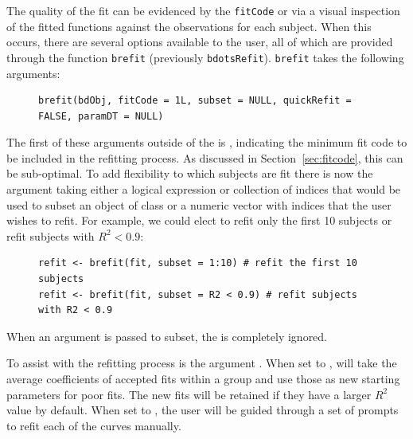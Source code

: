 The quality of the fit can be evidenced by the \texttt{fitCode} or via a visual inspection of the fitted functions against the observations for each subject.  When this occurs, there are several options available to the user, all of which are provided through the function \texttt{brefit} (previously \texttt{bdotsRefit}). \texttt{brefit} takes the following arguments:

\begin{singlespace}
\begin{figure}[H]
\centering
\begin{BVerbatim}
brefit(bdObj, fitCode = 1L, subset = NULL, quickRefit = FALSE, paramDT = NULL)
\end{BVerbatim}
\end{figure}
\end{singlespace}

The first of these arguments outside of the  is , indicating the minimum fit code to be included in the refitting process. As discussed in Section~\ref{sec:fitcode}, this can be sub-optimal. To add flexibility to which subjects are fit there is now the  argument taking either a logical expression or collection of indices that would be used to subset an object of class  or a numeric vector with indices that the user wishes to refit. For example, we could elect to refit only the first 10 subjects or refit subjects with $R^2 < 0.9$:

\begin{singlespace}
\begin{figure}[H]
\centering
\begin{BVerbatim}
refit <- brefit(fit, subset = 1:10) # refit the first 10 subjects
refit <- brefit(fit, subset = R2 < 0.9) # refit subjects with R2 < 0.9
\end{BVerbatim}
\end{figure}
\end{singlespace}

When an argument is passed to subset, the  is completely ignored.

To assist with the refitting process is the argument . When set to ,  will take the average coefficients of accepted fits within a group and use those as new starting parameters for poor fits. The new fits will be retained if they have a larger $R^2$ value by default. When set to , the user will be guided through a set of prompts to refit each of the curves manually. 

